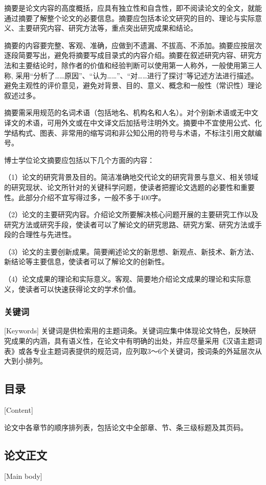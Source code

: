 摘要是论文内容的高度概括，应具有独立性和自含性，即不阅读论文的全文，就能通过摘要了解整个论文的必要信息。摘要应包括本论文研究的目的、理论与实际意义、主要研究内容、研究方法等，重点突出研究成果和结论。

摘要的内容要完整、客观、准确，应做到不遗漏、不拔高、不添加。摘要应按层次逐段简要写出，避免将摘要写成目录式的内容介绍。摘要在叙述研究内容、研究方法和主要结论时，除作者的价值和经验判断可以使用第一人称外，一般使用第三人称, 采用“分析了……原因”、“认为……”、“对……进行了探讨”等记述方法进行描述。避免主观性的评价意见，避免对背景、目的、意义、概念和一般性（常识性）理论叙述过多。

摘要需采用规范的名词术语（包括地名、机构名和人名）。对个别新术语或无中文译文的术语，可用外文或在中文译文后加括号注明外文。摘要中不宜使用公式、化学结构式、图表、非常用的缩写词和非公知公用的符号与术语，不标注引用文献编号。

博士学位论文摘要应包括以下几个方面的内容：

（1）论文的研究背景及目的。简洁准确地交代论文的研究背景与意义、相关领域的研究现状、论文所针对的关键科学问题，使读者把握论文选题的必要性和重要性。此部分介绍不宜写得过多，一般不多于400字。

（2）论文的主要研究内容。介绍论文所要解决核心问题开展的主要研究工作以及研究方法或研究手段，使读者可以了解论文的研究思路、研究方案、研究方法或手段的合理性与先进性。

（3）论文的主要创新成果。简要阐述论文的新思想、新观点、新技术、新方法、新结论等主要信息，使读者可以了解论文的创新性。

（4）论文成果的理论和实际意义。客观、简要地介绍论文成果的理论和实际意义，使读者可以快速获得论文的学术价值。

\subsubsection{关键词}[Keywords]
关键词是供检索用的主题词条。关键词应集中体现论文特色，反映研究成果的内涵，具有语义性，在论文中有明确的出处，并应尽量采用《汉语主题词表》或各专业主题词表提供的规范词，应列取3～6个关键词，按词条的外延层次从大到小排列。

\subsection{目录}[Content]

论文中各章节的顺序排列表，包括论文中全部章、节、条三级标题及其页码。

\subsection{论文正文}[Main body]

